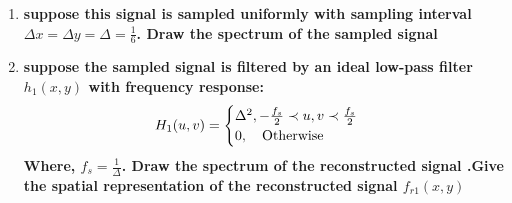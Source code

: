 \begin{enumerate}[font=\bfseries]
\begin{enumerate}[font=\bfseries, label=\alph*.]
	\item \textbf{suppose this signal is sampled uniformly with sampling
	interval $\Delta x = \Delta y = \Delta = \frac{1}{6}$. Draw the spectrum
	of the sampled signal}

	\item \textbf{suppose the sampled signal is filtered by an ideal
	low-pass filter $h_1(x,y)$ with frequency response:
	\begin{equation*}
	H_1(u,v) =
	    \begin{cases}
		\Delta^2 , -\frac{f_s}{2} \prec u, v \prec \frac{f_s}{2}\\
		0, \hspace{1 em} \text{Otherwise}
	    \end{cases}
	\end{equation*}
	Where, $f_s = \frac{1}{\Delta}$. Draw the spectrum of the
	reconstructed signal .Give the spatial representation of the
	reconstructed signal $f_{r1}(x,y)$}

    \end{enumerate}

\end{enumerate}
